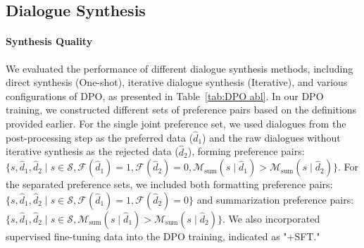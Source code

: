 

\subsection{Dialogue Synthesis}
\label{sec:result_dia}
\paragraph{Synthesis Quality}

We evaluated the performance of different dialogue synthesis methods, including direct synthesis (One-shot), iterative dialogue synthesis (Iterative), and various configurations of DPO, as presented in Table~\ref{tab:DPO abl}. In our DPO training, we constructed different sets of preference pairs based on the definitions provided earlier. For the single joint preference set, we used dialogues from the post-processing step as the preferred data (\( \hat{d}_1 \)) and the raw dialogues without iterative synthesis as the rejected data (\( \hat{d}_2 \)), forming preference pairs:
\(\{s, \hat{d}_1, \hat{d}_2 \mid s \in \mathcal{S}, \mathcal{F}(\hat{d}_1) = 1, \mathcal{F}(\hat{d}_2) = 0, \mathcal{M}_{\text{sum}}(s \mid \hat{d}_1) > \mathcal{M}_{\text{sum}}(s \mid \hat{d}_2)\}\). 
For the separated preference sets, we included both formatting preference pairs:
\(\{s, \hat{d}_1, \hat{d}_2 \mid s \in \mathcal{S}, \mathcal{F}(\hat{d}_1) = 1, \mathcal{F}(\hat{d}_2) = 0\}\)
and summarization preference pairs:
\(\{s, \hat{d}_1, \hat{d}_2 \mid s \in \mathcal{S}, \mathcal{M}_{\text{sum}}(s \mid \hat{d}_1) > \mathcal{M}_{\text{sum}}(s \mid \hat{d}_2)\}\). 
We also incorporated supervised fine-tuning data into the DPO training, indicated as "+SFT."

